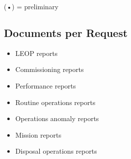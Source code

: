 (•) = preliminary

\subsection{Documents per Request}

\begin{itemize}
\item LEOP reports
\item Commissioning reports
\item Performance reports
\item Routine operations reports
\item Operations anomaly reports
\item Mission reports
\item Disposal operations reports
\end{itemize}
